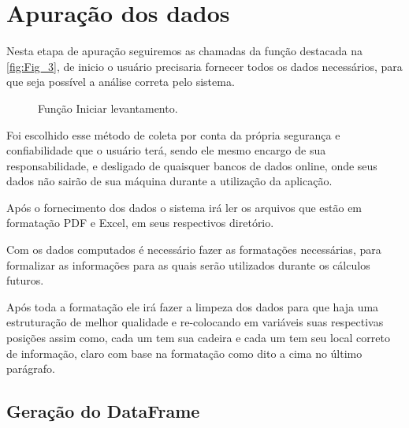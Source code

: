 


 \section{\textbf{Apuração dos dados}}%
 
\par Nesta etapa de apuração seguiremos as chamadas da função destacada na \autoref{fig:Fig_3}, de inicio o usuário precisaria fornecer todos os dados necessários, para que seja possível a análise correta pelo sistema.

\begin{figure}[ht]
    \caption{\label{fig:Fig_3}Função Iniciar levantamento.}
    \begin{center}
    \end{center}
\end{figure}

\par Foi escolhido esse método de coleta por conta da própria segurança e confiabilidade que o usuário terá, sendo ele mesmo encargo de sua responsabilidade, e desligado de quaisquer bancos de dados online, onde seus dados não sairão de sua máquina durante a utilização da aplicação.


\par Após o fornecimento dos dados o sistema irá ler os arquivos que estão em formatação PDF e Excel, em seus respectivos diretório.

\par Com os dados computados é necessário fazer as formatações necessárias, para formalizar as informações para as quais serão utilizados durante os cálculos futuros.

\par Após toda a formatação ele irá fazer a limpeza dos dados para que haja uma estruturação de melhor qualidade e re-colocando em variáveis suas respectivas posições assim como, cada um tem sua cadeira e cada um tem seu local correto de informação, claro com base na formatação como dito a cima no último parágrafo.

\subsection{Geração do DataFrame}

